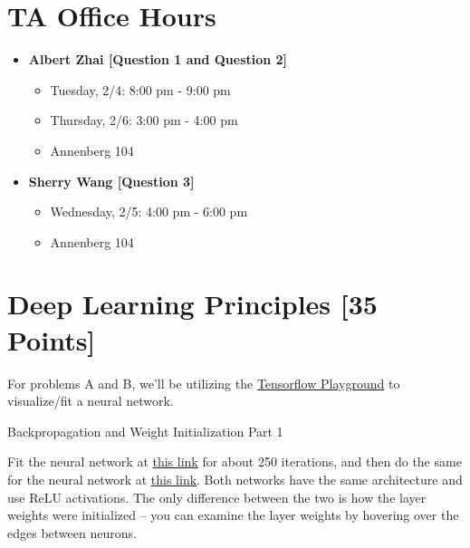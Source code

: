 \section*{TA Office Hours}
\begin{itemize}
    \item \textbf{Albert Zhai [Question 1 and Question 2]}
        \begin{itemize}
            \item Tuesday, 2/4: 8:00 pm - 9:00 pm
            \item Thursday, 2/6: 3:00 pm - 4:00 pm
            \item Annenberg 104
        \end{itemize}
    \item \textbf{Sherry Wang [Question 3]}
        \begin{itemize}
            \item Wednesday, 2/5: 4:00 pm - 6:00 pm
            \item Annenberg 104
        \end{itemize}
\end{itemize}


\newpage
\section{Deep Learning Principles [35 Points]}

 For problems A and B, we'll be utilizing the \href{http://playground.tensorflow.org/}{Tensorflow Playground} to visualize/fit a neural network.

\begin{problem}[5]
  Backpropagation and Weight Initialization Part 1
\end{problem}

Fit the neural network at \href{http://playground.tensorflow.org/#activation=relu&batchSize=10&dataset=circle&regDataset=reg-plane&learningRate=0.03&regularizationRate=0&noise=0&networkShape=4,2&seed=0.65409&showTestData=false&discretize=false&percTrainData=50&x=true&y=true&xTimesY=false&xSquared=false&ySquared=false&cosX=false&sinX=false&cosY=false&sinY=false&collectStats=false&problem=classification&initZero=false&hideText=false}{this link} for about 250 iterations, and then do the same for the neural network at  \href{http://playground.tensorflow.org//\#activation=relu&batchSize=10&dataset=circle&regDataset=reg-plane&learningRate=0.03&regularizationRate=0&noise=0&networkShape=4,2&seed=0.6&showTestData=false&discretize=false&percTrainData=50&x=true&y=true&xTimesY=false&xSquared=false&ySquared=false&cosX=false&sinX=false&cosY=false&sinY=false&collectStats=false&problem=classification&initZero=true&hideText=false}{this link}.  Both networks have the same architecture and use ReLU activations.  The only difference between the two is how the layer weights were initialized -- you can examine the layer weights by hovering over the edges between neurons.


